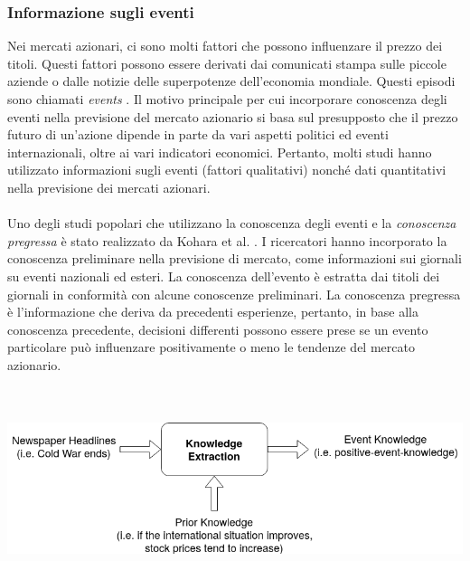 \documentclass[a4paper,12pt]{report}
\begin{document}
\subsubsection{Informazione sugli eventi}
Nei mercati azionari, ci sono molti fattori che possono influenzare il prezzo dei titoli. Questi fattori possono essere derivati dai comunicati stampa sulle piccole aziende o dalle notizie delle superpotenze dell'economia mondiale. Questi episodi sono chiamati \textit{events} \cite{29}. Il motivo principale per cui incorporare conoscenza degli eventi nella previsione del mercato azionario si basa sul presupposto che il prezzo futuro di un'azione dipende in parte da vari aspetti politici ed eventi internazionali, oltre ai vari indicatori economici. Pertanto, molti studi hanno utilizzato informazioni sugli eventi (fattori qualitativi) nonché dati quantitativi nella previsione dei mercati azionari.\\~\\ Uno degli studi popolari che utilizzano la conoscenza degli eventi e la \textit{conoscenza pregressa} è stato realizzato da Kohara et al. \cite{know-nn2}. I ricercatori hanno incorporato la conoscenza preliminare nella previsione di mercato, come informazioni sui giornali su eventi nazionali ed esteri. La conoscenza dell'evento è estratta dai titoli dei giornali in conformità con alcune conoscenze preliminari. La conoscenza pregressa è l'informazione che deriva da precedenti esperienze, pertanto, in base alla conoscenza precedente, decisioni differenti possono essere prese se un evento particolare può influenzare positivamente o meno le tendenze del mercato azionario.\\~\\\\
\begin{fig}
\includegraphics[width=\linewidth]{prior_knowledge}
\label{Figura 9}
\end{fig}
\end{document}
